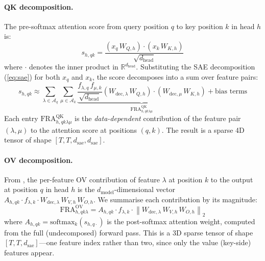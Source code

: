 \documentclass{article}
\theoremstyle{plain}
\theoremstyle{definition}
\theoremstyle{remark}
\newcommand{\dmodel}{d_{\mathrm{model}}}
\newcommand{\dhead}{d_{\mathrm{head}}}
\newcommand{\dsae}{d_{\mathrm{sae}}}
\newcommand{\RR}{\mathbb{R}}
\begin{document}
\paragraph{QK decomposition.} The pre-softmax attention score from query position $q$ to key position $k$ in head $h$ is:
\begin{equation}
    s_{h,qk} = \frac{\left(x_q\,W_{Q,h}\right) \cdot \left(x_k\,W_{K,h}\right)}{\sqrt{\dhead}}
    \label{eq:attn_score}
\end{equation}
where $\cdot$ denotes the inner product in $\RR^{\dhead}$. Substituting the SAE decomposition (\ref{eq:sae}) for both $x_q$ and $x_k$, the score decomposes into a sum over feature pairs:
\begin{equation}
    s_{h,qk} \approx \sum_{\lambda \in \mathcal{A}_q} \sum_{\mu \in \mathcal{A}_k} \underbrace{\frac{f_{\lambda,q} \, f_{\mu,k}}{\sqrt{\dhead}} \left(W_{\mathrm{dec},\lambda}\,W_{Q,h}\right) \cdot \left(W_{\mathrm{dec},\mu}\,W_{K,h}\right)}_{\mathrm{FRA}^{\mathrm{QK}}_{h,qk\lambda\mu}} + \text{bias terms}
    \label{eq:qk_fra}
\end{equation}
Each entry $\mathrm{FRA}^{\mathrm{QK}}_{h,qk\lambda\mu}$ is the \emph{data-dependent} contribution of the feature pair $(\lambda, \mu)$ to the attention score at positions $(q,k)$. The result is a sparse 4D tensor of shape $[T, T, \dsae, \dsae]$.

\paragraph{OV decomposition.} From , the per-feature OV contribution of feature $\lambda$ at position $k$ to the output at position $q$ in head $h$ is the $\dmodel$-dimensional vector $A_{h,qk} \cdot f_{\lambda,k} \cdot W_{\mathrm{dec},\lambda}\,W_{V,h}\,W_{O,h}$. We summarise each contribution by its magnitude:
\begin{equation}
    \mathrm{FRA}^{\mathrm{OV}}_{h,qk\lambda} = A_{h,qk} \cdot f_{\lambda,k} \cdot \left\lVert W_{\mathrm{dec},\lambda}\,W_{V,h}\,W_{O,h} \right\rVert_2
    \label{eq:ov_fra}
\end{equation}
where $A_{h,qk} = \mathrm{softmax}_k(s_{h,q\cdot})$ is the post-softmax attention weight, computed from the full (undecomposed) forward pass. This is a 3D sparse tensor of shape $[T, T, \dsae]$---one feature index rather than two, since only the value (key-side) features appear.
\end{document}
